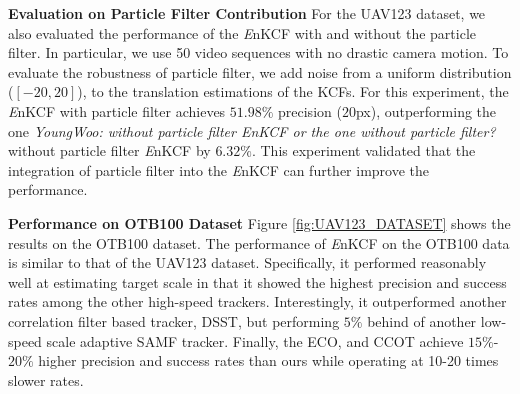 \documentclass[10pt,twocolumn,letterpaper]{article}
\begin{document}
\textbf{Evaluation on Particle Filter Contribution} For the UAV123
dataset, we also evaluated the performance of the {\it E}nKCF with and
without the particle filter. In particular, we use 50 video sequences
with no drastic camera motion. To evaluate the robustness of particle
filter, we add noise from a uniform distribution ($[-20,20]$), to the
translation estimations of the KCFs. For this experiment, the {\it
  E}nKCF with particle filter achieves $51.98\%$ precision ($20$px),
outperforming the one \textit{YoungWoo: without particle filter EnKCF or the one without particle filter?} without particle filter {\it E}nKCF by
$6.32\%$. This experiment validated that the integration of particle
filter into the {\it E}nKCF can further improve the performance.

\textbf{Performance on OTB100 Dataset} Figure \ref{fig:UAV123_DATASET}
shows the results on the OTB100 dataset. The performance of {\it
  E}nKCF on the OTB100 data is similar to that of the UAV123
dataset. Specifically, it performed reasonably well at estimating
target scale in that it showed the highest precision and success rates
among the other high-speed trackers. Interestingly, it outperformed
another correlation filter based tracker, DSST, but performing $5\%$
behind of another low-speed scale adaptive SAMF tracker. Finally, the
ECO, and CCOT achieve $15\%$-$20\%$ higher precision and success rates
than ours while operating at 10-20 times slower rates.
\end{document}

